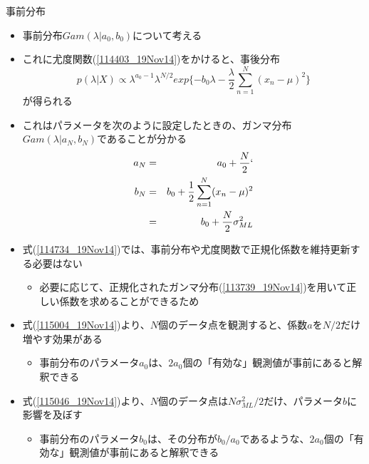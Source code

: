 \begin{frame}{事前分布}
 \begin{itemize}
  \item 事前分布$Gam(\lambda|a_0,b_0)$について考える
  \item これに尤度関数(\ref{114403_19Nov14})をかけると、事後分布
        \begin{equation}
         p(\lambda|X) \propto \lambda^{a_0-1}\lambda^{N/2}exp\{-b_0\lambda-\frac{\lambda}{2}\sum_{n=1}^{N}(x_n-\mu)^2\}\label{114734_19Nov14}
        \end{equation}
        が得られる
  \item これはパラメータを次のように設定したときの、ガンマ分布$Gam(\lambda|a_N,b_N)$であることが分かる
        \begin{eqnarray}
         a_N&=& a_0 + \frac{N}{2}`\label{115004_19Nov14}\\
         b_N&= & b_0+\frac{1}{2}\sum_{n=1}^{N}(x_n-\mu)^2\\
         &= & b_0+\frac{N}{2}\sigma^2_{ML}\label{115046_19Nov14}
        \end{eqnarray}
 \end{itemize}
\end{frame}

\begin{frame}
 \begin{itemize}
  \item 式(\ref{114734_19Nov14})では、事前分布や尤度関数で正規化係数を維持更新する必要はない
        \begin{itemize}
         \item 必要に応じて、正規化されたガンマ分布(\ref{113739_19Nov14})を用いて正しい係数を求めることができるため
        \end{itemize}
  \item 式(\ref{115004_19Nov14})より、$N$個のデータ点を観測すると、係数$a$を$N/2$だけ増やす効果がある
        \begin{itemize}
         \item 事前分布のパラメータ$a_0$は、$2a_0$個の「有効な」観測値が事前にあると解釈できる
        \end{itemize}
  \item 式(\ref{115046_19Nov14})より、$N$個のデータ点は$N\sigma_{ML}^2/2$だけ、パラメータ$b$に影響を及ぼす
        \begin{itemize}
         \item 事前分布のパラメータ$b_0$は、その分布が$b_0/a_0$であるような、$2a_0$個の「有効な」観測値が事前にあると解釈できる
        \end{itemize}
 \end{itemize}
\end{frame}

